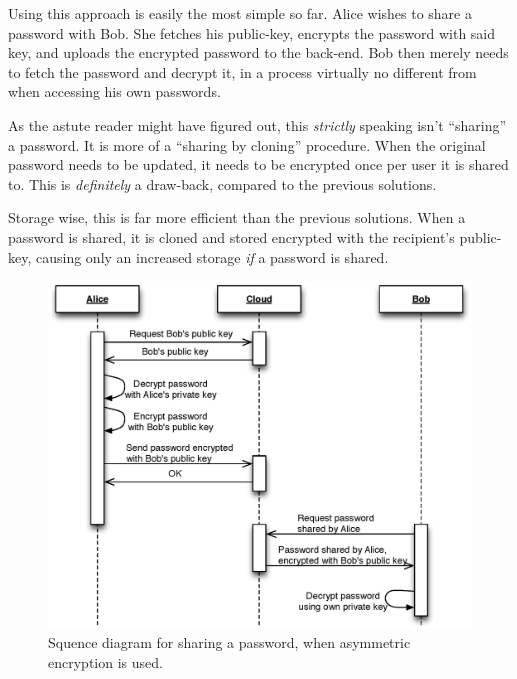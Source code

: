 				Using this approach is easily the most simple so far. Alice wishes to share a password with Bob. She fetches his public-key, encrypts the password with said key, and uploads the encrypted password to the back-end. Bob then merely needs to fetch the password and decrypt it, in a process virtually no different from when accessing his own passwords.

				As the astute reader might have figured out, this \emph{strictly} speaking isn't ``sharing'' a password. It is more of a ``sharing by cloning'' procedure. When the original password needs to be updated, it needs to be encrypted once per user it is shared to. This is \emph{definitely} a draw-back, compared to the previous solutions. 

				Storage wise, this is far more efficient than the previous solutions. When a password is shared, it is cloned and stored encrypted with the recipient's public-key, causing only an increased storage \emph{if} a password is shared.

				\begin{figure}[h!]
					\centering
					\includegraphics[width=\textwidth]{figures/design/uml/sequence/sharing-asymmetric.eps}
					\caption{Squence diagram for sharing a password, when asymmetric encryption is used.}
					\label{fig:sequence:asymmetric}
				\end{figure}



